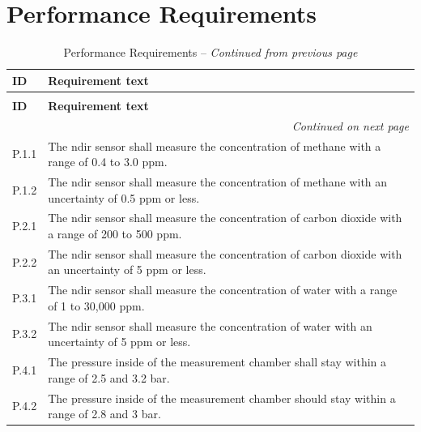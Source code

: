 \section{Performance Requirements}
\begin{longtable}{|p{2cm}|p{12cm}|}
\caption{Performance Requirements \label{tab:performance_req}} \\
\hline
\textbf{ID} & \textbf{Requirement text} \\
\hline
\endfirsthead
\caption[]{Performance Requirements -- \textit{Continued from previous page}} \\
\hline
\textbf{ID} & \textbf{Requirement text} \\
\hline
\endhead
\hline
\multicolumn{2}{r}{\textit{Continued on next page}} \\
\endfoot
\hline
\endlastfoot
P.1.1 & The \gls{ndir} sensor shall measure the concentration of methane with a range of 0.4 to 3.0 ppm. \\
\hline
P.1.2 & The \gls{ndir} sensor shall measure the concentration of methane with an uncertainty of 0.5 ppm or less. \\
\hline
P.2.1 & The \gls{ndir} sensor shall measure the concentration of carbon dioxide with a range of 200 to 500 ppm. \\
\hline
P.2.2 & The \gls{ndir} sensor shall measure the concentration of carbon dioxide with an uncertainty of 5 ppm or less. \\
\hline
P.3.1 & The \gls{ndir} sensor shall measure the concentration of water with a range of 1 to 30,000 ppm. \\
\hline
P.3.2 & The \gls{ndir} sensor shall measure the concentration of water with an uncertainty of 5 ppm or less. \\
\hline
P.4.1 & The pressure inside of the measurement chamber shall stay within a range of 2.5 and 3.2 bar. \\
\hline
P.4.2 & The pressure inside of the measurement chamber should stay within a range of 2.8 and 3 bar. \\

\end{longtable}
